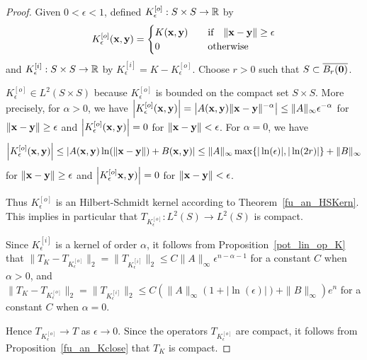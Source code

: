 \begin{proof}
Given $0 < \epsilon <1$, defined
$\displaystyle K_\epsilon^{[o]}:S\times S \rightarrow \mathbb{R}$
by
\[
K_\epsilon^{[o]}(\mathbf{x},\mathbf{y}) =
\begin{cases}
K(\mathbf{x},\mathbf{y}) & \quad \text{if} \quad 
\|\mathbf{x}-\mathbf{y}\| \geq \epsilon \\
0 & \quad \text{otherwise}
\end{cases}
\]
and $\displaystyle K_\epsilon^{[i]}:S\times S \rightarrow \mathbb{R}$ by
$\displaystyle K_\epsilon^{[i]} = K - K_\epsilon^{[o]}$.  Choose $r>0$
such that $S \subset \overline{B_r(\mathbf{0})}$.

 $\displaystyle K_\epsilon^{[o]} \in L^2(S \times S)$ because
$\displaystyle K_\epsilon^{[o]}$ is bounded on the compact set $S \times S$.
More precisely, for $\alpha>0$, we have
$\displaystyle
\left|K_\epsilon^{[o]}(\mathbf{x},\mathbf{y})\right| =
\left| A(\mathbf{x},\mathbf{y}) \|\mathbf{x} - \mathbf{y} \|^{-\alpha} \right|
\leq \|A\|_{\infty} \epsilon^{-\alpha}$
for $\|\mathbf{x}-\mathbf{y}\| \geq \epsilon$ and
$\displaystyle \left|K_\epsilon^{[o]}(\mathbf{x},\mathbf{y})\right| = 0$
for $\|\mathbf{x}-\mathbf{y}\| < \epsilon$.
For $\alpha = 0$, we have
\[
\left|K_\epsilon^{[o]}(\mathbf{x},\mathbf{y})\right|
\leq
\left| A(\mathbf{x},\mathbf{y}) \ln(\|\mathbf{x} - \mathbf{y} \|) + B(\mathbf{x},\mathbf{y})
\right|
\leq \|A\|_{\infty} \max \{ |\ln(\epsilon)|, |\ln(2r)| \} +
\|B\|_\infty
\]
for $\|\mathbf{x}-\mathbf{y}\| \geq \epsilon$ and
$\displaystyle
\left|K_\epsilon^{[o]}\mathbf{x},\mathbf{y})\right| = 0$
for $\|\mathbf{x}-\mathbf{y}\| < \epsilon$.

Thus $\displaystyle K_\epsilon^{[o]}$ is an Hilbert-Schmidt kernel according to
Theorem~\ref{fu_an_HSKern}.  This implies in
particular that $T_{K_\epsilon^{[o]}}:L^2(S) \rightarrow L^2(S)$ is compact.

 Since $\displaystyle K_\epsilon^{[i]}$ is a kernel of order $\alpha$,
it follows from Proposition~\ref{pot_lin_op_K} that
$\displaystyle
\|T_K - T_{K_\epsilon^{[o]}}\|_2 =
\|T_{K_\epsilon^{[i]}}\|_2 \leq C \|A\|_\infty \epsilon^{n-\alpha-1}$
for a constant $C$ when $\alpha>0$, and
$\displaystyle
\|T_K - T_{K_\epsilon^{[o]}}\|_2 =
\|T_{K_\epsilon^{[i]}}\|_2 \leq C \left( \|A\|_\infty
  (1+|\ln(\epsilon)|) + \|B\|_\infty \right) e^{n}$
for a constant $C$ when $\alpha = 0$.

Hence $\displaystyle T_{K_\epsilon^{[o]}} \rightarrow T$ as
$\epsilon \rightarrow 0$.
Since the operators $\displaystyle T_{K_\epsilon^{[o]}}$ are compact,
it follows from Proposition~\ref{fu_an_Kclose} that $T_K$ is compact.
\end{proof}

